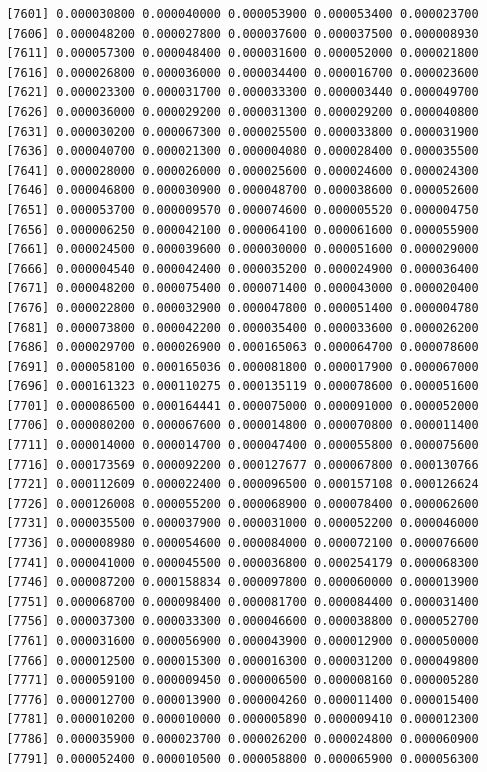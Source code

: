\documentclass[]{article}
\begin{document}
\begin{verbatim}
 [7601] 0.000030800 0.000040000 0.000053900 0.000053400 0.000023700
 [7606] 0.000048200 0.000027800 0.000037600 0.000037500 0.000008930
 [7611] 0.000057300 0.000048400 0.000031600 0.000052000 0.000021800
 [7616] 0.000026800 0.000036000 0.000034400 0.000016700 0.000023600
 [7621] 0.000023300 0.000031700 0.000033300 0.000003440 0.000049700
 [7626] 0.000036000 0.000029200 0.000031300 0.000029200 0.000040800
 [7631] 0.000030200 0.000067300 0.000025500 0.000033800 0.000031900
 [7636] 0.000040700 0.000021300 0.000004080 0.000028400 0.000035500
 [7641] 0.000028000 0.000026000 0.000025600 0.000024600 0.000024300
 [7646] 0.000046800 0.000030900 0.000048700 0.000038600 0.000052600
 [7651] 0.000053700 0.000009570 0.000074600 0.000005520 0.000004750
 [7656] 0.000006250 0.000042100 0.000064100 0.000061600 0.000055900
 [7661] 0.000024500 0.000039600 0.000030000 0.000051600 0.000029000
 [7666] 0.000004540 0.000042400 0.000035200 0.000024900 0.000036400
 [7671] 0.000048200 0.000075400 0.000071400 0.000043000 0.000020400
 [7676] 0.000022800 0.000032900 0.000047800 0.000051400 0.000004780
 [7681] 0.000073800 0.000042200 0.000035400 0.000033600 0.000026200
 [7686] 0.000029700 0.000026900 0.000165063 0.000064700 0.000078600
 [7691] 0.000058100 0.000165036 0.000081800 0.000017900 0.000067000
 [7696] 0.000161323 0.000110275 0.000135119 0.000078600 0.000051600
 [7701] 0.000086500 0.000164441 0.000075000 0.000091000 0.000052000
 [7706] 0.000080200 0.000067600 0.000014800 0.000070800 0.000011400
 [7711] 0.000014000 0.000014700 0.000047400 0.000055800 0.000075600
 [7716] 0.000173569 0.000092200 0.000127677 0.000067800 0.000130766
 [7721] 0.000112609 0.000022400 0.000096500 0.000157108 0.000126624
 [7726] 0.000126008 0.000055200 0.000068900 0.000078400 0.000062600
 [7731] 0.000035500 0.000037900 0.000031000 0.000052200 0.000046000
 [7736] 0.000008980 0.000054600 0.000084000 0.000072100 0.000076600
 [7741] 0.000041000 0.000045500 0.000036800 0.000254179 0.000068300
 [7746] 0.000087200 0.000158834 0.000097800 0.000060000 0.000013900
 [7751] 0.000068700 0.000098400 0.000081700 0.000084400 0.000031400
 [7756] 0.000037300 0.000033300 0.000046600 0.000038800 0.000052700
 [7761] 0.000031600 0.000056900 0.000043900 0.000012900 0.000050000
 [7766] 0.000012500 0.000015300 0.000016300 0.000031200 0.000049800
 [7771] 0.000059100 0.000009450 0.000006500 0.000008160 0.000005280
 [7776] 0.000012700 0.000013900 0.000004260 0.000011400 0.000015400
 [7781] 0.000010200 0.000010000 0.000005890 0.000009410 0.000012300
 [7786] 0.000035900 0.000023700 0.000026200 0.000024800 0.000060900
 [7791] 0.000052400 0.000010500 0.000058800 0.000065900 0.000056300

\end{verbatim}
\end{document}

